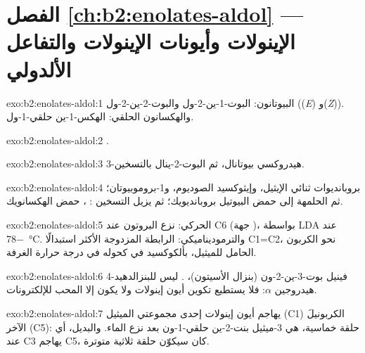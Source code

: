 \section*{الفصل \ref{ch:b2:enolates-aldol} --- الإينولات وأيونات الإينولات والتفاعل الألدولي}

\begin{solution}{exo:b2:enolates-aldol:1}
البيوتانون: البوت-1-ين-2-ول  والبوت-2-ين-2-ول  ((\textit{E}) 
و(\textit{Z})). والهكسانون الحلقي: الهكس-1-ين حلقي-1-ول.
\end{solution}

\begin{solution}{exo:b2:enolates-aldol:2}
.
\end{solution}

\begin{solution}{exo:b2:enolates-aldol:3}
3-هيدروكسي بيوتانال، ثم البوت-2-ينال بالتسخين.
\end{solution}

\begin{solution}{exo:b2:enolates-aldol:4}
بروبانديوات ثنائي الإيثيل، وإيثوكسيد الصوديوم، و1-بروموبيوتان؛ ثم الحلمهة إلى حمض البيوتيل بروبانديويك؛
ثم يزيل التسخين : ، حمض الهكسانويك.
\end{solution}

\begin{solution}{exo:b2:enolates-aldol:5}
الحركي: نزع البروتون عند C6 (جهة )، بواسطة LDA عند \qty{-78}{\degreeCelsius}. والترموديناميكي:
الرابطة المزدوجة الأكثر استبدالًا C1=C2، نحو الكربون الحامل للميثيل، بألكوكسيد في
كحوله في درجة حرارة الغرفة.
\end{solution}

\begin{solution}{exo:b2:enolates-aldol:6}
4-فينيل بوت-3-ين-2-ون (بنزال الأسيتون)، . ليس للبنزالدهيد هيدروجين $\alpha$: فلا
يستطيع تكوين أيون إينولات ولا يكون إلا المحب للإلكترونات.
\end{solution}

\begin{solution}{exo:b2:enolates-aldol:7}
يهاجم أيون إينولات إحدى مجموعتي الميثيل (C1) الكربونيلَ الآخر (C5): حلقة خماسية،
هي 3-ميثيل بنت-2-ين حلقي-1-ون بعد نزع الماء. والبديل، أي  عند C3 يهاجم C5،
كان سيكوّن حلقة ثلاثية متوترة.
\end{solution}

